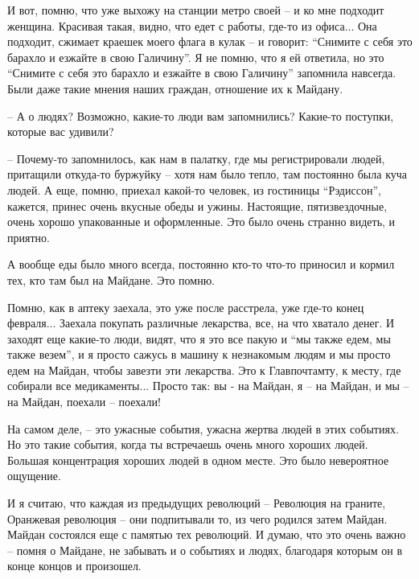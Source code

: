 И вот, помню, что уже выхожу на станции метро своей – и ко мне подходит
женщина. Красивая такая, видно, что едет с работы, где-то из офиса... Она
подходит, сжимает краешек моего флага в кулак – и говорит: \enquote{Снимите с себя это
барахло и езжайте в свою Галичину}. Я не помню, что я ей ответила, но это
\enquote{Снимите с себя это барахло и езжайте в свою Галичину} запомнила навсегда. Были
даже такие мнения наших граждан, отношение их к Майдану.

– А о людях? Возможно, какие-то люди вам запомнились? Какие-то поступки,
которые вас удивили?

– Почему-то запомнилось, как нам в палатку, где мы регистрировали людей,
притащили откуда-то буржуйку – хотя нам было тепло, там постоянно была куча
людей. А еще, помню, приехал какой-то человек, из гостиницы \enquote{Рэдиссон},
кажется, принес очень вкусные обеды и ужины. Настоящие, пятизвездочные, очень
хорошо упакованные и оформленные. Это было очень странно видеть, и приятно.

А вообще еды было много всегда, постоянно кто-то что-то приносил и кормил тех,
кто там был на Майдане. Это помню.

Помню, как в аптеку заехала, это уже после расстрела, уже где-то конец
февраля... Заехала покупать различные лекарства, все, на что хватало денег. И
заходят еще какие-то люди, видят, что я это все пакую и \enquote{мы также едем, мы
также везем}, и я просто сажусь в машину к незнакомым людям и мы просто едем на
Майдан, чтобы завезти эти лекарства. Это к Главпочтамту, к месту, где собирали
все медикаменты... Просто так: вы - на Майдан, я – на Майдан, и мы – на Майдан,
поехали – поехали!

На самом деле, – это ужасные события, ужасна жертва людей в этих событиях. Но
это такие события, когда ты встречаешь очень много хороших людей. Большая
концентрация хороших людей в одном месте. Это было невероятное ощущение.

И я считаю, что каждая из предыдущих революций – Революция на граните,
Оранжевая революция – они подпитывали то, из чего родился затем Майдан. Майдан
состоялся еще с памятью тех революций. И думаю, что это очень важно – помня о
Майдане, не забывать и о событиях и людях, благодаря которым он в конце концов
и произошел.
